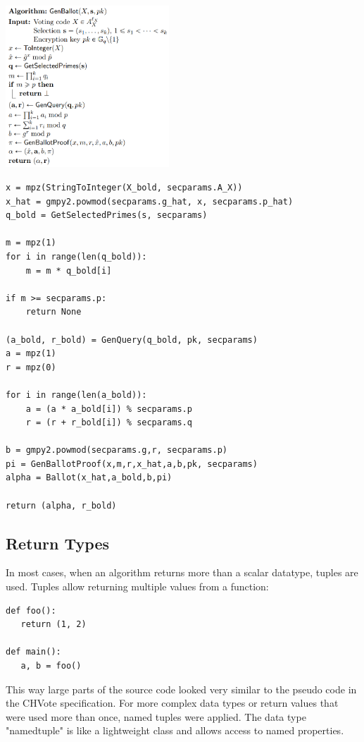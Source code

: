 \begin{multicols}{2}
\includegraphics[width=0.46\textwidth]{assets/genballot.png}
\columnbreak
\begin{verbatim}
x = mpz(StringToInteger(X_bold, secparams.A_X))
x_hat = gmpy2.powmod(secparams.g_hat, x, secparams.p_hat)
q_bold = GetSelectedPrimes(s, secparams)

m = mpz(1)
for i in range(len(q_bold)):
    m = m * q_bold[i]

if m >= secparams.p:
    return None

(a_bold, r_bold) = GenQuery(q_bold, pk, secparams)
a = mpz(1)
r = mpz(0)

for i in range(len(a_bold)):
    a = (a * a_bold[i]) % secparams.p
    r = (r + r_bold[i]) % secparams.q

b = gmpy2.powmod(secparams.g,r, secparams.p)
pi = GenBallotProof(x,m,r,x_hat,a,b,pk, secparams)
alpha = Ballot(x_hat,a_bold,b,pi)

return (alpha, r_bold)
\end{verbatim}
\end{multicols}

\subsection{Return Types}
In most cases, when an algorithm returns more than a scalar datatype, tuples are used. Tuples allow returning multiple values from a function:

\begin{verbatim}
def foo():
   return (1, 2)

def main():
   a, b = foo()
\end{verbatim}

This way large parts of the source code looked very similar to the pseudo code in the CHVote specification. For more complex data types or return values that were used more than once, named tuples were applied. The data type "namedtuple" is like a lightweight class and allows access to named properties.

